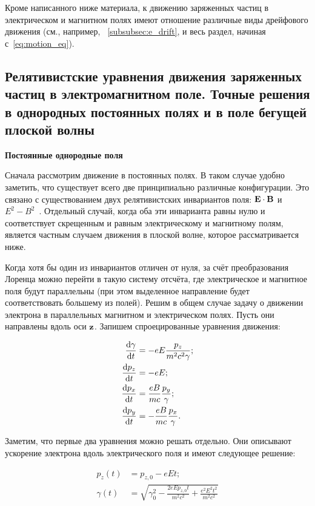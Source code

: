 \documentclass[10pt, a4paper]{article}
\begin{document}
Кроме написанного ниже материала, к движению заряженных частиц в электрическом и магнитном полях имеют отношение различные виды дрейфового движения (см., например, ~\ref{subsubsec:e_drift}, и весь раздел, начиная с~\eqref{eq:motion_eq}).

\subsection{Релятивистские уравнения движения заряженных частиц в электромагнитном поле. Точные решения в однородных постоянных полях и в поле бегущей плоской волны}

\textbf{Постоянные однородные поля}

Сначала рассмотрим движение в постоянных полях. В таком случае удобно заметить, что существует всего две принципиально различные конфигурации. Это связано с существованием двух релятивистских инвариантов поля: $\vb{E}\cdot\vb{B}$ и $E^2-B^2$~\cite{kotelnikov}. Отдельный случай, когда оба эти инварианта равны нулю и соответствует скрещенным и равным электрическому и магнитному полям, является частным случаем движения в плоской волне, которое рассматривается ниже. 

Когда хотя бы один из инвариантов отличен от нуля, за счёт преобразования Лоренца можно перейти в такую систему отсчёта, где электрическое и магнитное поля будут параллельны (при этом выделенное направление будет соответствовать большему из полей). Решим в общем случае задачу о движении электрона в параллельных магнитном и электрическом полях. Пусть они направлены вдоль оси $\vb{z}$. Запишем спроецированные уравнения движения:

\begin{align*}
	\dv{\gamma}{t} &= -eE\frac{p_z}{m^2c^2\gamma}; \\
	\dv{p_z}{t} &= -eE; \\
	\dv{p_x}{t} &= \frac{eB}{mc}\frac{p_y}{\gamma}; \\
	\dv{p_y}{t} &= -\frac{eB}{mc}\frac{p_x}{\gamma}. \\
\end{align*}

Заметим, что первые два уравнения можно решать отдельно. Они описывают ускорение электрона вдоль электрического поля и имеют следующее решение:

\begin{align*}
	p_z(t) &= p_{z,0} - eEt; \\
	\gamma(t) &= \sqrt{\gamma_0^2 - \frac{2eEp_{z,0}t}{m^2c^2} + \frac{e^2E^2t^2}{m^2c^2}}
\end{align*}
\end{document}
